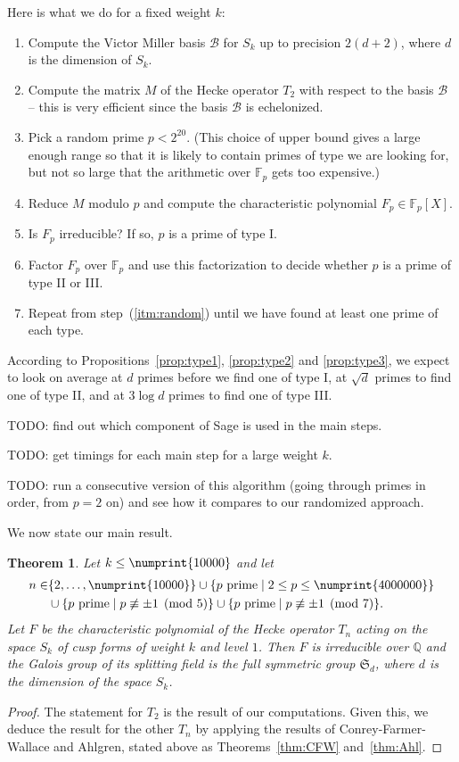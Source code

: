 \documentclass[11pt]{article}
\theoremstyle{plain}
\newtheorem{theorem}{Theorem}[section]
\theoremstyle{definition}
\theoremstyle{remark}
\numberwithin{equation}{section}
\numberwithin{table}{section}
\newcommand{\FF}{\mathbb{F}}
\newcommand{\QQ}{\mathbb{Q}}
\newcommand{\cB}{\mathcal{B}}
\renewcommand{\SS}{\mathfrak{S}}
\newcommand{\bound}{\numprint{10000}}
\begin{document}
Here is what we do for a fixed weight $k$:
\begin{enumerate}
  \item Compute the Victor Miller basis $\cB$ for $S_k$ up to precision
    $2(d+2)$, where $d$ is the dimension of $S_k$.
  \item Compute the matrix $M$ of the Hecke operator $T_2$ with respect to the
    basis $\cB$ -- this is very efficient since the basis $\cB$ is
    echelonized.
  \item\label{itm:random} Pick a random prime $p<2^{20}$. (This choice of upper
    bound gives a large enough range so that it is likely to contain primes of
    type we are looking for, but not so large that the arithmetic over $\FF_p$
    gets too expensive.)
  \item Reduce $M$ modulo $p$ and compute the characteristic polynomial
    $F_p\in \FF_p[X]$.
  \item Is $F_p$ irreducible?  If so, $p$ is a prime of type I.
  \item Factor $F_p$ over $\FF_p$ and use this factorization to decide whether
    $p$ is a prime of type II or III.
  \item Repeat from step~(\ref{itm:random}) until we have found at
    least one prime of each type.
\end{enumerate}

According to Propositions~\ref{prop:type1}, \ref{prop:type2} and
\ref{prop:type3}, we expect to look on average at $d$ primes before we find
one of type I, at $\sqrt{d}$ primes to find one of type II, and at $3\log d$
primes to find one of type III.

TODO: find out which component of Sage is used in the main steps.

TODO: get timings for each main step for a large weight $k$.

TODO: run a consecutive version of this algorithm (going through primes in
order, from $p=2$ on) and see how it compares to our randomized approach.

We now state our main result.

\begin{theorem}\label{thm:main}
  Let $k\leq \bound$ and let
  \begin{align*}
    n\in &\{2,\ldots,\numprint{10000}\}\cup
    \{p\text{ prime}\mid 2\leq p\leq\numprint{4000000}\}\\
    &\cup\{p\text{ prime}\mid p\not\equiv\pm 1\pmod{5}\}\cup
    \{p\text{ prime}\mid p\not\equiv\pm 1\pmod{7}\}.
  \end{align*}
  Let $F$ be the characteristic polynomial of the
  Hecke operator $T_n$ acting on the space $S_k$ of cusp forms of weight
  $k$ and level $1$.  Then $F$ is irreducible over $\QQ$ and the Galois
  group of its splitting field is the full symmetric group $\SS_d$, 
  where $d$ is the dimension of the space $S_k$.
\end{theorem}
\begin{proof}
  The statement for $T_2$ is the result of our computations.  Given this, we
  deduce the result for the other $T_n$ by applying the results of
  Conrey-Farmer-Wallace and Ahlgren, stated above as Theorems~\ref{thm:CFW}
  and~\ref{thm:Ahl}.
\end{proof}
\end{document}
